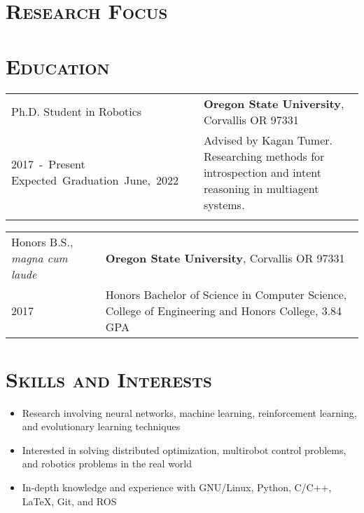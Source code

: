 \documentclass[letterpaper,10pt,titlepage]{article}
\newcommand{\leftW}{0.32\textwidth}
\begin{document}
\pagestyle{empty}%
\par{\par}

\section*{\textsc{Research Focus}}
\section*{\textsc{Education}}
\begin{tabularx}{\textwidth}{p{\leftW}X}
	Ph.D. Student in Robotics & \textbf{Oregon State University}, Corvallis OR 97331\\

	\mbox{2017 - Present} \mbox{Expected Graduation June, 2022}& Advised by Kagan Tumer. Researching methods for introspection and intent reasoning in multiagent systems.\\
	 &\\
\end{tabularx}
\begin{tabularx}{\textwidth}{p{\leftW}X}
	Honors B.S., \textit{magna cum laude} & \textbf{Oregon State University}, Corvallis OR 97331\\
	2017 & Honors Bachelor of Science in Computer Science, College of Engineering and Honors College, 3.84 GPA \\
\end{tabularx}

\section*{\textsc{Skills and Interests}}
\begin{itemize} \itemsep1pt \parskip0pt 
\item Research involving neural networks, machine learning, reinforcement learning, and evolutionary learning techniques
\item Interested in solving distributed optimization, multirobot control problems, and robotics problems in the real world
\item In-depth knowledge and experience with GNU/Linux, Python, C/C++, \LaTeX, Git, and ROS
\end{itemize}
\end{document}
